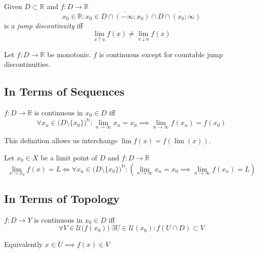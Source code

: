 \begin{definition}
   Given \(D \subset \mathbb{R}\) and \(f: D \to \mathbb{R}\)
   \[x_0 \in \mathbb{R}: x_0 \in \overline{D \cap (-\infty; x_0)} \cap \overline{D \cap (x_0; \infty)}\]
   is a \emph{jump discontinuity} iff
   \[\lim_{x \uparrow a} f(x) \neq \lim_{x \downarrow a} f(x)\]
\end{definition}

\begin{theorem}
   Let \(f:D \to \mathbb{R}\) be monotonic.
   \(f\) is continuous except for countable jump discontinuities.
\end{theorem}

\subsection{In Terms of Sequences}
\begin{definition}\label{def:seq_cont}
   \(f: D \to \mathbb{R}\) is continuous in \(x_0 \in D\) iff
   \[\forall x_n \in \big(D\setminus\{x_0\}\big)^\mathbb{N}: \lim_{n \to \infty} x_n = x_0 \implies \lim_{n \to \infty} f(x_n) = f(x_0)\]
\end{definition}
\begin{remark}
   This definition allows us interchange \(\lim f(x) = f(\lim(x))\).
\end{remark}

\begin{proposition}[Function Limit = Sequence Limit]
   Let \(x_0 \in X\) be a limit point of \(D\) and \(f: D \to \mathbb{R}\)
   \[\lim_{x \to x_0} f(x) = L \iff \forall x_n \in \big(D\setminus\{x_0\}\big)^\mathbb{N}: \left(\lim_{n \to \infty} x_n = x_0 \implies  \lim_{n \to \infty} f(x_n) = L\right)\]
\end{proposition}

\subsection{In Terms of Topology}
\begin{definition}\label{def:neigh_cont}
   \(f: D \to Y\) is continuous in \(x_0 \in D\) iff
   \[\forall V \in \mathcal{U}\big(f(x_0)\big)~\exists U \in \mathcal{U}(x_0): f(U \cap D) \subset V\]
\end{definition}
\begin{remark}
   Equivalently \(x \in U \implies f(x) \in V\)
\end{remark}

